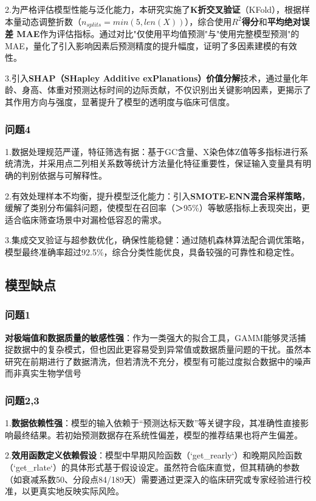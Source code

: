 \documentclass{article}
\begin{document}
2.为严格评估模型性能与泛化能力，本研究实施了\textbf{K折交叉验证}（KFold），根据样本量动态调整折数（$n_{splits}=min(5, len(X))$），综合使用$R^2$\textbf{得分}和\textbf{平均绝对误差 MAE}作为评估指标。通过对比"仅使用平均值预测"与"使用完整模型预测"的MAE，量化了引入影响因素后预测精度的提升幅度，证明了多因素建模的有效性。

3.引入\textbf{SHAP（SHapley Additive exPlanations）价值分解}技术，通过量化年龄、身高、体重对预测达标时间的边际贡献，不仅识别出关键影响因素，更揭示了其作用方向与强度，显著提升了模型的透明度与临床可信度。
\subsubsection{\textbf{问题4}}
1.数据处理规范严谨，特征筛选有据：基于GC含量、X染色体Z值等多指标进行系统清洗，并采用点二列相关系数等统计方法量化特征重要性，保证输入变量具有明确的判别依据与可解释性。

2.有效处理样本不均衡，提升模型泛化能力：引入\textbf{SMOTE-ENN混合采样策略}，缓解了类别分布偏斜问题，使模型在召回率（＞95\%）等敏感指标上表现突出，更适合临床筛查场景中对漏检低容忍的需求。

3.集成交叉验证与超参数优化，确保性能稳健：通过随机森林算法配合调优策略，模型最终准确率超过92.5\%，综合分类性能优良，具备较强的可靠性和稳定性。
\subsection{\textbf{模型缺点}}
\subsubsection{\textbf{问题1}}
\textbf{对极端值和数据质量的敏感性强}：作为一类强大的拟合工具，GAMM能够灵活捕捉数据中的复杂模式，但也因此更容易受到异常值或数据质量问题的干扰。虽然本研究在前期进行了数据清洗，但若清洗不充分，模型有可能过度拟合数据中的噪声而非真实生物学信号
\subsubsection{\textbf{问题2,3}}
1.\textbf{数据依赖性强}：模型的输入依赖于“预测达标天数”等关键字段，其准确性直接影响最终结果。若初始预测数据存在系统性偏差，模型的推荐结果也将产生偏差。

2.\textbf{效用函数定义依赖假设}：模型中早期风险函数（`get\_rearly`）和晚期风险函数（`get\_rlate`）的具体形式基于假设设定。虽然符合临床直觉，但其精确的参数（如衰减系数50、分段点84/189天）需要通过更深入的临床研究或专家经验进行校准，以更真实地反映实际风险。
\end{document}
